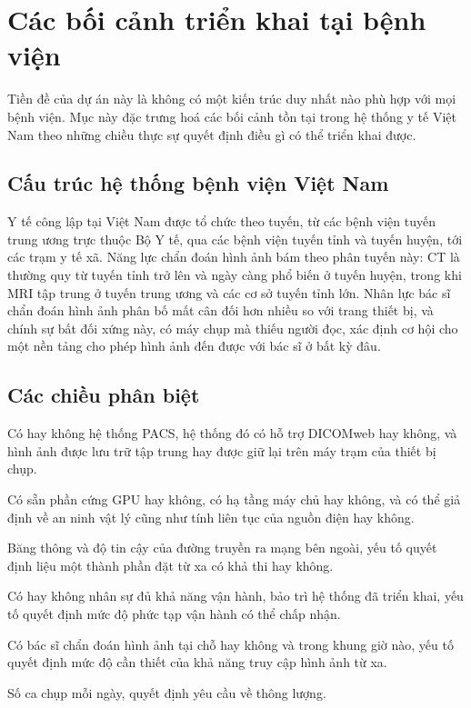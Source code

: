 \section{Các bối cảnh triển khai tại bệnh viện}
\label{sec:contexts}

Tiền đề của dự án này là không có một kiến trúc duy nhất nào phù hợp với mọi
bệnh viện. Mục này đặc trưng hoá các bối cảnh tồn tại trong hệ thống y tế Việt
Nam theo những chiều thực sự quyết định điều gì có thể triển khai được.

\subsection{Cấu trúc hệ thống bệnh viện Việt Nam}

Y tế công lập tại Việt Nam được tổ chức theo tuyến, từ các bệnh viện tuyến
trung ương trực thuộc Bộ Y tế, qua các bệnh viện tuyến tỉnh và tuyến huyện, tới
các trạm y tế xã. Năng lực chẩn đoán hình ảnh bám theo phân tuyến này: CT là
thường quy từ tuyến tỉnh trở lên và ngày càng phổ biến ở tuyến huyện, trong khi
MRI tập trung ở tuyến trung ương và các cơ sở tuyến tỉnh lớn. Nhân lực bác sĩ
chẩn đoán hình ảnh phân bố mất cân đối hơn nhiều so với trang thiết bị, và
chính sự bất đối xứng này, có máy chụp mà thiếu người đọc, xác định cơ hội cho
một nền tảng cho phép hình ảnh đến được với bác sĩ ở bất kỳ đâu.

\subsection{Các chiều phân biệt}

\begin{description}[leftmargin=3.0cm,style=nextline]
    \item[Hạ tầng hình ảnh] Có hay không hệ thống PACS, hệ thống đó có hỗ trợ
          DICOMweb hay không, và hình ảnh được lưu trữ tập trung hay được giữ
          lại trên máy trạm của thiết bị chụp.
    \item[Tài nguyên tính toán] Có sẵn phần cứng GPU hay không, có hạ tầng máy
          chủ hay không, và có thể giả định về an ninh vật lý cũng như tính
          liên tục của nguồn điện hay không.
    \item[Kết nối mạng] Băng thông và độ tin cậy của đường truyền ra mạng bên
          ngoài, yếu tố quyết định liệu một thành phần đặt từ xa có khả thi hay
          không.
    \item[Năng lực CNTT] Có hay không nhân sự đủ khả năng vận hành, bảo trì hệ
          thống đã triển khai, yếu tố quyết định mức độ phức tạp vận hành có
          thể chấp nhận.
    \item[Nhân lực lâm sàng] Có bác sĩ chẩn đoán hình ảnh tại chỗ hay không và
          trong khung giờ nào, yếu tố quyết định mức độ cần thiết của khả năng
          truy cập hình ảnh từ xa.
    \item[Khối lượng] Số ca chụp mỗi ngày, quyết định yêu cầu về thông lượng.
\end{description}

